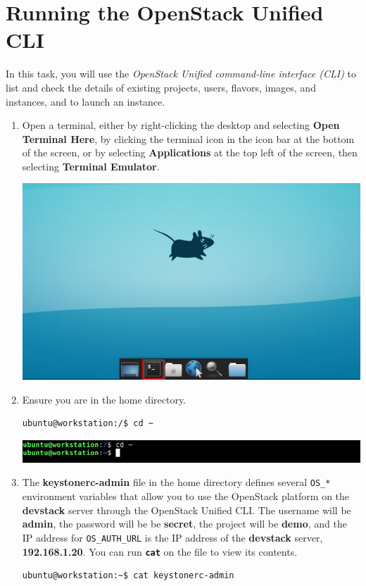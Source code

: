 \documentclass[letterpaper, 12pt]{article}
\begin{document}
\section{Running the OpenStack Unified CLI}
In this task, you will use the \textit{OpenStack Unified command-line interface (CLI)} to list and check the details of
existing projects, users, flavors, images, and instances, and to launch an instance.

\begin{enumerate}
    \item Open a terminal, either by right-clicking the desktop and selecting \textbf{Open Terminal Here}, by clicking
    the terminal icon in the icon bar at the bottom of the screen, or by selecting \textbf{Applications} at the top
    left of the screen, then selecting \textbf{Terminal Emulator}.

    \begin{center}
        \includegraphics[width=\linewidth]{images/part2/step1.png}
    \end{center}

    \item Ensure you are in the home directory.
\begin{lstlisting}
ubuntu@workstation:/$ cd ~
\end{lstlisting}

    \begin{center}
        \includegraphics[width=\linewidth]{images/part2/step2.png}
    \end{center}

    \item The \textbf{keystonerc-admin} file in the home directory defines several \texttt{OS\_*} environment variables
    that allow you to use the OpenStack platform on the \textbf{devstack} server through the OpenStack Unified
    CLI. The username will be \textbf{admin}, the password will be be \textbf{secret}, the project will be
    \textbf{demo}, and the IP address for \texttt{OS\_AUTH\_URL} is the IP address of the \textbf{devstack} server,
    \textbf{192.168.1.20}. You can run \textbf{\texttt{cat}} on the file to view its contents.
\begin{lstlisting}
ubuntu@workstation:~$ cat keystonerc-admin
\end{lstlisting}


\end{enumerate}
\end{document}
